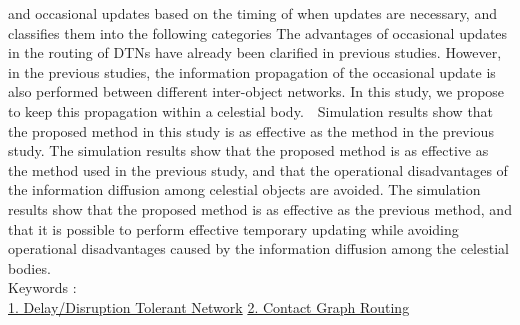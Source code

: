 and occasional updates based on the timing of when updates are necessary, and classifies them into the following categories The advantages of occasional updates in the routing of DTNs have already been clarified in previous studies. However, in the previous studies, the information propagation of the occasional update is also performed between different inter-object networks. In this study, we propose to keep this propagation within a celestial body.　Simulation results show that the proposed method in this study is as effective as the method in the previous study. The simulation results show that the proposed method is as effective as the method used in the previous study, and that the operational disadvantages of the information diffusion among celestial objects are avoided. The simulation results show that the proposed method is as effective as the previous method, and that it is possible to perform effective temporary updating while avoiding operational disadvantages caused by the information diffusion among the celestial bodies.
~ \\
Keywords : \\
\underline{1. Delay/Disruption Tolerant Network} 
\underline{2. Contact Graph Routing} 
\begin{flushright}
\edept \\
\eauthor
\end{flushright}